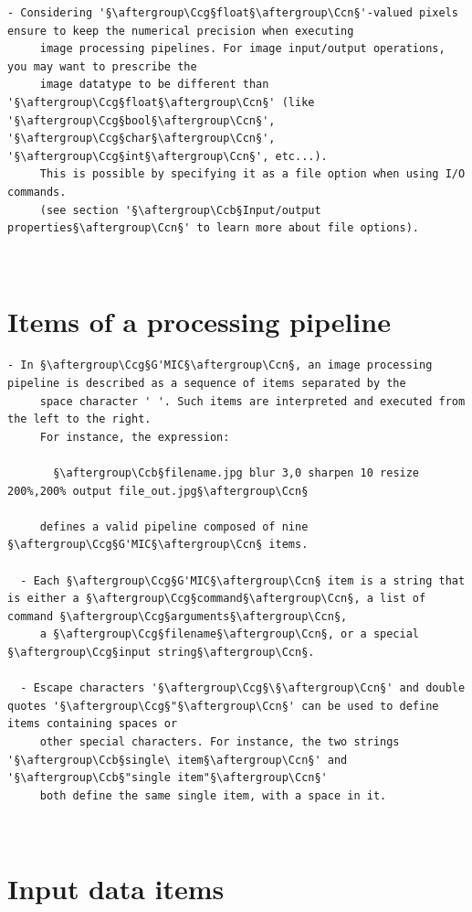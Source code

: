 \documentclass[a4paper,10.5pt,twoside]{book}
\def\Ccb{\color{cb}}
\def\Ccg{\color{cc}}
\def\Ccn{\color{black}}
\begin{document}
\begin{lstlisting}[escapechar=§]
  - Considering '§\aftergroup\Ccg§float§\aftergroup\Ccn§'-valued pixels ensure to keep the numerical precision when executing 
     image processing pipelines. For image input/output operations, you may want to prescribe the 
     image datatype to be different than '§\aftergroup\Ccg§float§\aftergroup\Ccn§' (like '§\aftergroup\Ccg§bool§\aftergroup\Ccn§', '§\aftergroup\Ccg§char§\aftergroup\Ccn§', '§\aftergroup\Ccg§int§\aftergroup\Ccn§', etc...). 
     This is possible by specifying it as a file option when using I/O commands. 
     (see section '§\aftergroup\Ccb§Input/output properties§\aftergroup\Ccn§' to learn more about file options).
\end{lstlisting}
\normalsize
~\\\section{Items of a processing pipeline}
\small
\begin{lstlisting}[escapechar=§]
  - In §\aftergroup\Ccg§G'MIC§\aftergroup\Ccn§, an image processing pipeline is described as a sequence of items separated by the 
     space character ' '. Such items are interpreted and executed from the left to the right. 
     For instance, the expression: 
 
       §\aftergroup\Ccb§filename.jpg blur 3,0 sharpen 10 resize 200%,200% output file_out.jpg§\aftergroup\Ccn§ 
 
     defines a valid pipeline composed of nine §\aftergroup\Ccg§G'MIC§\aftergroup\Ccn§ items. 
 
  - Each §\aftergroup\Ccg§G'MIC§\aftergroup\Ccn§ item is a string that is either a §\aftergroup\Ccg§command§\aftergroup\Ccn§, a list of command §\aftergroup\Ccg§arguments§\aftergroup\Ccn§, 
     a §\aftergroup\Ccg§filename§\aftergroup\Ccn§, or a special §\aftergroup\Ccg§input string§\aftergroup\Ccn§. 
 
  - Escape characters '§\aftergroup\Ccg§\§\aftergroup\Ccn§' and double quotes '§\aftergroup\Ccg§"§\aftergroup\Ccn§' can be used to define items containing spaces or 
     other special characters. For instance, the two strings '§\aftergroup\Ccb§single\ item§\aftergroup\Ccn§' and '§\aftergroup\Ccb§"single item"§\aftergroup\Ccn§' 
     both define the same single item, with a space in it.
\end{lstlisting}
\normalsize
~\\\section{Input data items}
\end{document}
